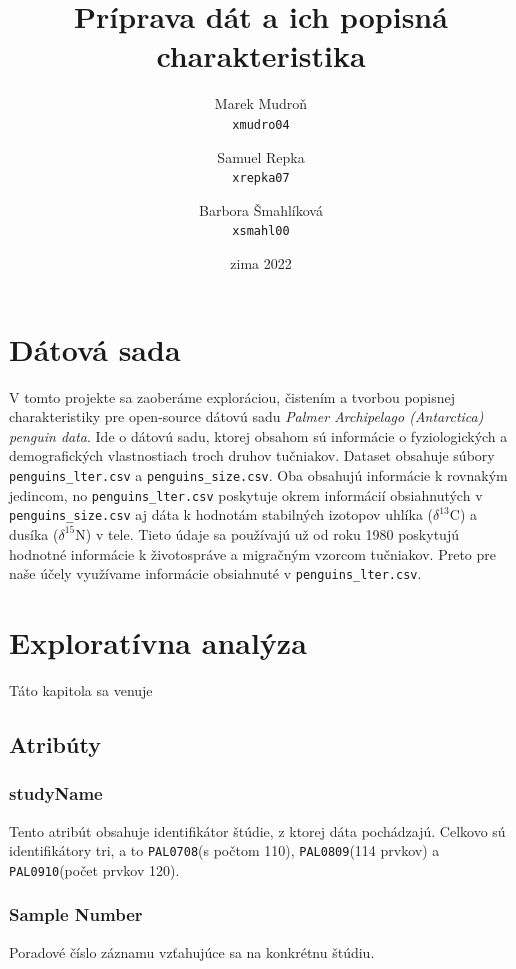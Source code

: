 \documentclass[10pt,xcolor=pdflatex,dvipsnames,table,oneside]{book}
\author{
  Marek Mudroň\\
  \texttt{xmudro04}
  \and
  Samuel Repka\\
  \texttt{xrepka07}
  \and
  Barbora Šmahlíková\\
  \texttt{xsmahl00}
}
\title{Príprava dát a ich popisná charakteristika}
\date{zima 2022}
\begin{document}

\hypersetup{pageanchor=false}%
\maketitle
\hypersetup{pageanchor=true}
\tableofcontents

\newpage%


\chapter{Dátová sada}

V tomto projekte sa zaoberáme exploráciou, čistením a tvorbou popisnej charakteristiky pre open-source dátovú sadu
\textit{Palmer Archipelago (Antarctica) penguin data}. Ide o dátovú sadu, ktorej obsahom sú informácie o fyziologických a demografických vlastnostiach troch druhov tučniakov. Dataset obsahuje súbory \texttt{penguins\_lter.csv} a \texttt{penguins\_size.csv}. Oba obsahujú informácie k rovnakým jedincom,  no \texttt{penguins\_lter.csv} poskytuje okrem informácií obsiahnutých v \texttt{penguins\_size.csv} aj dáta k hodnotám stabilných izotopov uhlíka  ($\delta^{13}$C)  a dusíka  ($\delta^{15}$N)  v tele. Tieto údaje sa používajú už od roku 1980  poskytujú hodnotné informácie k životospráve a migračným vzorcom tučniakov. Preto pre naše účely využívame informácie obsiahnuté v \texttt{penguins\_lter.csv}.

\chapter{Exploratívna analýza}
Táto kapitola sa venuje
\section{Atribúty}

\subsection*{studyName}
Tento atribút obsahuje identifikátor štúdie, z ktorej dáta pochádzajú. Celkovo sú identifikátory tri, a to \texttt{PAL0708}(s počtom 110), \texttt{PAL0809}(114 prvkov) a \texttt{PAL0910}(počet prvkov 120).

\subsection*{Sample Number}
Poradové číslo záznamu vzťahujúce sa na konkrétnu štúdiu.
\end{document}
